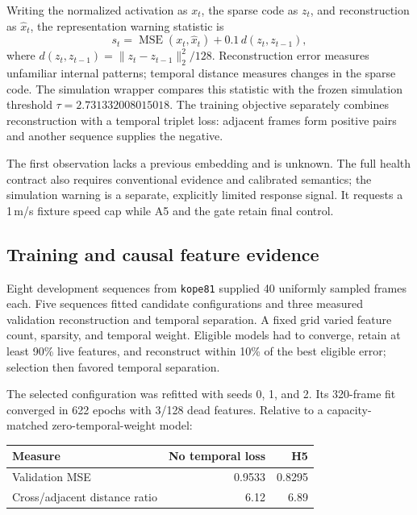 \documentclass[sigconf,nonacm]{acmart}
\begin{document}
Writing the normalized activation as $x_t$, the sparse code as $z_t$, and reconstruction as $\hat{x}_t$, the representation warning statistic is
\[
 s_t=\operatorname{MSE}(x_t,\hat{x}_t)
       +0.1\,d(z_t,z_{t-1}),
\]
where $d(z_t,z_{t-1})=\|z_t-z_{t-1}\|_2^2/128$. Reconstruction error measures unfamiliar internal patterns; temporal distance measures changes in the sparse code. The simulation wrapper compares this statistic with the frozen simulation threshold $\tau=2.731332008015018$. The training objective separately combines reconstruction with a temporal triplet loss: adjacent frames form positive pairs and another sequence supplies the negative.

The first observation lacks a previous embedding and is unknown. The full health contract also requires conventional evidence and calibrated semantics; the simulation warning is a separate, explicitly limited response signal. It requests a 1\,m/s fixture speed cap while A5 and the gate retain final control.


\subsection{Training and causal feature evidence}
Eight development sequences from \texttt{kope81} supplied 40 uniformly sampled frames each. Five sequences fitted candidate configurations and three measured validation reconstruction and temporal separation. A fixed grid varied feature count, sparsity, and temporal weight. Eligible models had to converge, retain at least 90\% live features, and reconstruct within 10\% of the best eligible error; selection then favored temporal separation.

The selected configuration was refitted with seeds 0, 1, and 2. Its 320-frame fit converged in 622 epochs with 3/128 dead features. Relative to a capacity-matched zero-temporal-weight model:

\begin{center}
\begin{minipage}{\columnwidth}
\centering
{}
\small
\begin{tabularx}{\columnwidth}{@{}Xrr@{}}
\toprule
Measure & No temporal loss & H5\\
\midrule
Validation MSE & 0.9533 & 0.8295\\
Cross/adjacent distance ratio & 6.12 & 6.89\\
\bottomrule
\end{tabularx}
\end{minipage}
\end{center}
\end{document}

